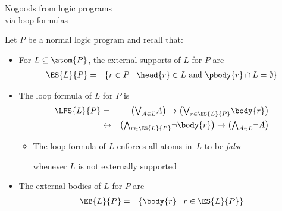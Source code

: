 \begin{frame}{Nogoods from logic programs\\[-1ex]\normalsize via loop formulas}

  Let $P$ be a normal logic program and recall that:
  \begin{itemize}
  \item <1->
    For $L\subseteq\atom{P}$,
    the external supports of $L$ for $P$ are
    \begin{eqnarray*}
      \ES{L}{P}
      & = &
      \{r\in P\mid\head{r}\in L \text{ and } \pbody{r}\cap L=\emptyset\}
    \end{eqnarray*}

  \item <2->
    The loop formula of $L$ for $P$ is
    \begin{eqnarray*}
      \LFS{L}{P}
      & = &
      \big(
      \mbox{$\bigvee_{A\in L}$} A
      \big)
      \rightarrow
      \big(
      \mbox{$\bigvee_{r\in\ES{L}{P}}$}
      {\body{r}}
      \big)
      \\
      & \leftrightarrow &
      \big(
      \mbox{$\bigwedge_{r\in\ES{L}{P}}$}
      \neg%
      {\body{r}}
      \big)
      \rightarrow
      \big(
      \mbox{$\bigwedge_{A\in L}$}\neg A
      \big)
    \end{eqnarray*}
    \vspace*{-4mm}
    \begin{itemize}
    \item {}
      The loop formula of $L$ enforces
      all atoms in~$L$ to be \emph{false}
      \par
      whenever $L$ is not externally supported
    \end{itemize}

  \item <3-> The external bodies of $L$ for $P$ are
    \begin{eqnarray*}
      \EB{L}{P} & = & \{\body{r} \mid r\in \ES{L}{P}\}
    \end{eqnarray*}
  \end{itemize}
\end{frame}
